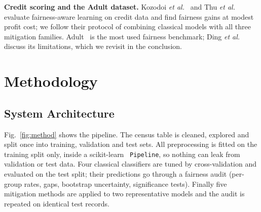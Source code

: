 \documentclass[conference]{IEEEtran}
\begin{document}
\textbf{Credit scoring and the Adult dataset.} Kozodoi \textit{et al.}~\cite{kozodoi2022} and Thu \textit{et al.}~\cite{thu2026} evaluate fairness-aware learning on credit data and find fairness gains at modest profit cost; we follow their protocol of combining classical models with all three mitigation families. Adult~\cite{kohavi1996,dua2019} is the most used fairness benchmark; Ding \textit{et al.}~\cite{ding2021} discuss its limitations, which we revisit in the conclusion.

\section{Methodology}
\subsection{System Architecture}
Fig.~\ref{fig:method} shows the pipeline. The census table is cleaned, explored and split once into training, validation and test sets. All preprocessing is fitted on the training split only, inside a scikit-learn~\cite{pedregosa2011} \texttt{Pipeline}, so nothing can leak from validation or test data. Four classical classifiers are tuned by cross-validation and evaluated on the test split; their predictions go through a fairness audit (per-group rates, gaps, bootstrap uncertainty, significance tests). Finally five mitigation methods are applied to two representative models and the audit is repeated on identical test records.
\end{document}
